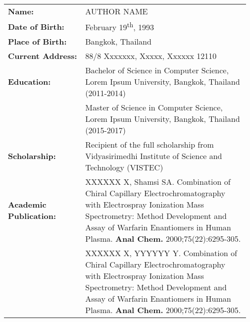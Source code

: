 \newcommand{\ts}{\textsuperscript}

\renewcommand{\arraystretch}{1.5} %
\leftskip-0.29cm
\begin{longtable}{p{0.31\linewidth}p{0.66\linewidth}}

\textbf{Name:}                      &       \MakeUppercase{Author Name} \\

\textbf{Date of Birth:}             &       February 19\ts{th}, 1993   \\

\textbf{Place of Birth:}            &       Bangkok, Thailand  \\

\textbf{Current Address:}           &       88/8 Xxxxxxx, Xxxxx, Xxxxxx 12110 \\

\textbf{Education:}                 &       Bachelor of Science in Computer Science, Lorem Ipsum University, Bangkok, Thailand (2011-2014) \\
{}                                  &       Master of Science in Computer Science, Lorem Ipsum University, Bangkok, Thailand (2015-2017)   
 \\
 
\textbf{Scholarship:}               &       Recipient of the full scholarship from Vidyasirimedhi \break Institute of Science and Technology (VISTEC)  \\

\textbf{Academic Publication:}      &      XXXXXX X, Shamsi SA. Combination of Chiral Capillary Electrochromatography with Electrospray Ionization Mass Spectrometry: Method Development and Assay of Warfarin Enantiomers in Human Plasma. \textbf{Anal Chem.} 2000;75(22):6295-305. \\
{}                                  &       
XXXXXX X, YYYYYY Y. Combination of Chiral Capillary Electrochromatography with Electrospray Ionization Mass Spectrometry: Method Development and Assay of Warfarin Enantiomers in Human Plasma. \textbf{Anal Chem.} 2000;75(22):6295-305. 

\end{longtable}
